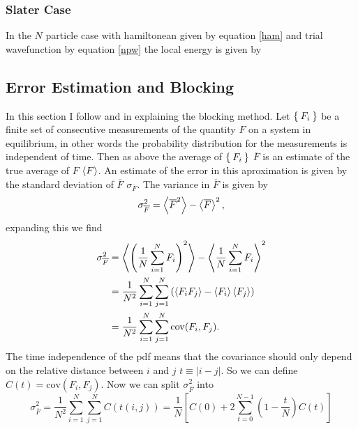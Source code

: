 \documentclass[a4paper,norsk,10pt]{article}
\newcommand{\be}{\begin{equation}}
\newcommand{\ee}{\end{equation}}
\newcommand{\f}{\frac}
\renewcommand{\bar}{\overline}
\renewcommand{\braket}{\Braket}
\begin{document}
\subsubsection{Slater Case}
In the $N$ particle case with hamiltonean given by equation \ref{ham} and trial wavefunction by equation \ref{npw} the local energy is given by


\subsection{Error Estimation and Blocking}
In this section I follow \cite{block} and \cite{mortenbok} in explaining the blocking method.
Let $\Set{F_i}$ be a finite set of consecutive measurements of the quantity $F$ on a system in equilibrium, in other words the probability distribution for the measurements is
independent of time. Then as above the average of $\Set{F_i}$ $\bar{F}$ is an estimate of the true average of $F$ $\braket{F}$. An estimate of the error in this aproximation
is given by the standard deviation of $\bar{F}$ $\sigma_{\bar{F}}$. The variance in $\bar{F}$ is given by
\be
\sigma_{\bar{F}}^2 = \Braket{\bar{F}^2} - \braket{\bar{F}}^2,
\ee
expanding this we find
\begin{align*}
  \sigma_{\bar{F}}^2 &= \braket{\left(\f{1}{N}\sum_{i=1}^NF_i\right)^2} - \braket{\f{1}{N}\sum_{i=1}^NF_i}^2\\
  &=\f{1}{N^2}\sum_{i=1}^N\sum_{j=1}^N\left(\braket{F_iF_j} - \braket{F_i}\braket{F_j}\right)\\
  &= \f{1}{N^2}\sum_{i=1}^N\sum_{j=1}^N\mathrm{cov}(F_i,F_j).
\end{align*}
The time independence of the pdf means that the covariance should only depend on the relative distance between $i$ and $j$
$t \equiv |i-j|$. So we can define $C(t) = \mathrm{cov}(F_i,F_j)$. Now we can split $\sigma_{\bar{F}}^2$ into
\be
\sigma_{\bar{F}}^2 = \f{1}{N^2}\sum_{i=1}^N\sum_{j=1}^NC(t(i,j)) = \f{1}{N}\left[C(0) + 2\sum_{t = 0}^{N-1}\left(1-\f{t}{N}\right)C(t)\right] \label{errvar}
\ee
\end{document}
